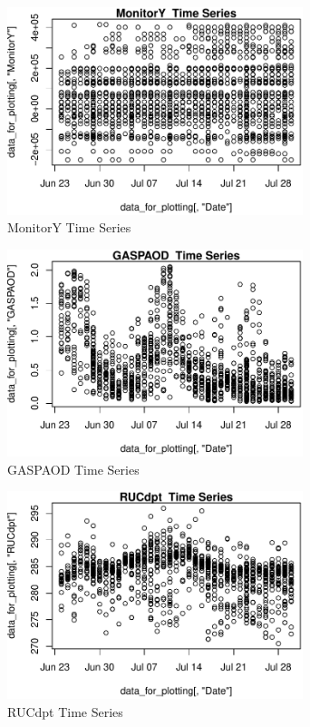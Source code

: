 \begin{figure} 
\centering  
\includegraphics[width=0.77\textwidth]{Code_Outputs/ML_input_report_AllforCaret_cleaned_StepPractice_part_practice_MonitorYTS.pdf} 
\caption{\label{fig:ML_input_report_AllforCaret_cleaned_StepPractice_part_practiceMonitorYTS}MonitorY  Time Series} 
\end{figure} 
 

\begin{figure} 
\centering  
\includegraphics[width=0.77\textwidth]{Code_Outputs/ML_input_report_AllforCaret_cleaned_StepPractice_part_practice_GASPAODTS.pdf} 
\caption{\label{fig:ML_input_report_AllforCaret_cleaned_StepPractice_part_practiceGASPAODTS}GASPAOD  Time Series} 
\end{figure} 
 

\begin{figure} 
\centering  
\includegraphics[width=0.77\textwidth]{Code_Outputs/ML_input_report_AllforCaret_cleaned_StepPractice_part_practice_RUCdptTS.pdf} 
\caption{\label{fig:ML_input_report_AllforCaret_cleaned_StepPractice_part_practiceRUCdptTS}RUCdpt  Time Series} 
\end{figure} 
 

